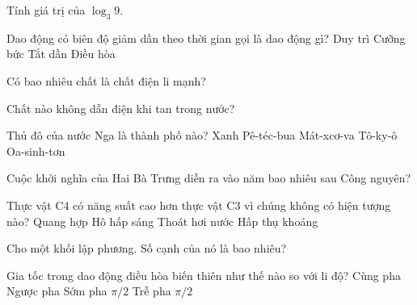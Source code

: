 \begin{ex}
    Tính giá trị của $\log_3 9$.
\end{ex}
\begin{ex}
    Dao động có biên độ giảm dần theo thời gian gọi là dao động gì?
    \choice
    {Duy trì}
    {Cưỡng bức}
    {\True Tắt dần}
    {Điều hòa}
\end{ex}
\begin{ex}
    \begin{chc}
        Có bao nhiêu chất là chất điện li mạnh?
    \end{chc}
    \begin{chc}
        Chất nào không dẫn điện khi tan trong nước?
    \end{chc}
\end{ex}
\begin{ex}
    Thủ đô của nước Nga là thành phố nào?
    \choice
    {Xanh Pê-téc-bua}
    {\True Mát-xcơ-va}
    {Tô-ky-ô}
    {Oa-sinh-tơn}
\end{ex}
\begin{ex}
    Cuộc khởi nghĩa của Hai Bà Trưng diễn ra vào năm bao nhiêu sau Công nguyên?
\end{ex}
\begin{ex}
    Thực vật C4 có năng suất cao hơn thực vật C3 vì chúng không có hiện tượng nào?
    \choice
    {Quang hợp}
    {\True Hô hấp sáng}
    {Thoát hơi nước}
    {Hấp thụ khoáng}
\end{ex}
\begin{ex}
    Cho một khối lập phương. Số cạnh của nó là bao nhiêu?
\end{ex}
\begin{ex}
    Gia tốc trong dao động điều hòa biến thiên như thế nào so với li độ?
    \choice
    {Cùng pha}
    {\True Ngược pha}
    {Sớm pha $\pi/2$}
    {Trễ pha $\pi/2$}
\end{ex}
